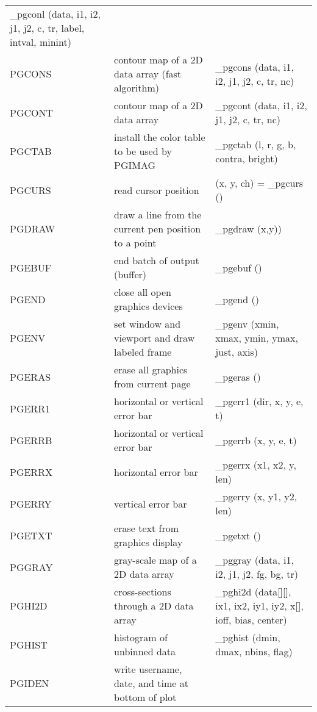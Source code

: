 \documentclass{book}
\begin{document}
{\begin{center}
\begin{tabular}{|l|p{2.5in}|p{2.25in}|}
\_pgconl (data, i1, i2, j1, j2, c, tr, label, intval, minint) \\
PGCONS & contour map of a 2D data array  (fast algorithm)       &
\_pgcons (data, i1, i2, j1, j2, c, tr, nc) \\
PGCONT & contour map of a 2D data array                                 &
\_pgcont (data, i1, i2, j1, j2, c, tr, nc) \\
PGCTAB & install the color table to be used by PGIMAG            &
\_pgctab (l, r, g, b, contra, bright) \\
PGCURS & read cursor position                                              &
(x, y, ch) = \_pgcurs () \\
PGDRAW & draw a line from the current pen position to a point           &
\_pgdraw (x,y)) \\
PGEBUF & end batch of output (buffer)                                   &
\_pgebuf () \\
PGEND & close all open graphics devices                                 &
\_pgend () \\
PGENV & set window and viewport and draw labeled frame                  &
\_pgenv (xmin, xmax, ymin, ymax, just, axis) \\
PGERAS & erase all graphics from current page                           &
\_pgeras () \\
PGERR1 & horizontal or vertical error bar                               &
\_pgerr1 (dir, x, y, e, t) \\
PGERRB & horizontal or vertical error bar                               &
\_pgerrb (x, y, e, t) \\
PGERRX & horizontal error bar                                           &
\_pgerrx (x1, x2, y, len) \\
PGERRY & vertical error bar                                             &
\_pgerry (x, y1, y2, len) \\
PGETXT & erase text from graphics display                               &
\_pgetxt () \\
PGGRAY & gray-scale map of a 2D data array                                     &
\_pggray (data, i1, i2, j1, j2, fg, bg, tr) \\
PGHI2D & cross-sections through a 2D data array                         &
\_pghi2d (data[][], ix1, ix2, iy1, iy2, x[], ioff, bias, center) \\
PGHIST & histogram of unbinned data                                     &
\_pghist (dmin, dmax, nbins, flag) \\
PGIDEN & write username, date, and time at bottom of plot               &

\end{tabular}
\end{center}}
\end{document}
